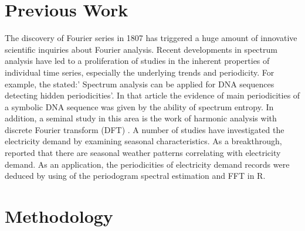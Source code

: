 \documentclass[12pt,msc]{uom_eee_dissertation_casson}
\begin{document}
\section{Previous Work} %
\label{sec:previous-work}
The discovery of Fourier series in 1807 has triggered a huge amount of innovative scientific inquiries about Fourier analysis. Recent developments in spectrum analysis have led to a proliferation of studies in the inherent properties of individual time series, especially the underlying trends and periodicity. For example, the \citet{5306832} stated:' Spectrum analysis can be applied for DNA sequences detecting hidden periodicities'. In that article the evidence of main periodicities of a symbolic DNA sequence was given by the ability of spectrum entropy. In addition, a seminal study in this area is the work of harmonic analysis with discrete Fourier transform (DFT) \citep{harris1978use}. A number of studies have investigated the electricity demand by examining seasonal characteristics. As a breakthrough, \citet{sinden2007characteristics} reported that there are seasonal weather patterns correlating with electricity demand. As an application, the periodicities of electricity demand records were deduced by using of the periodogram spectral estimation and FFT in R.

\section{Methodology}
\label{sec:methodology}
\end{document}
